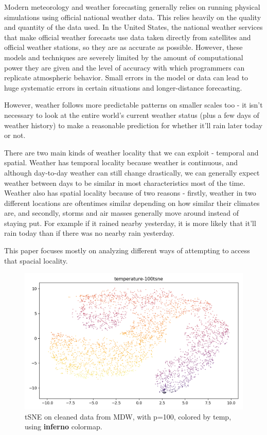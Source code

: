 \documentclass[a4paper]{article}
\begin{document}
Modern meteorology and weather forecasting generally relies on running physical simulations using official national weather data. This relies heavily on the quality and quantity of the data used. In the United States, the national weather services that make official weather forecasts use data taken directly from satellites and official weather stations, so they are as accurate as possible. However, these models and techniques are severely limited by the amount of computational power they are given and the level of accuracy with which programmers can replicate atmospheric behavior. Small errors in the model or data can lead to huge systematic errors in certain situations and longer-distance forecasting.

However, weather follows more predictable patterns on smaller scales too - it isn't necessary to look at the entire world's current weather status (plus a few days of weather history) to make a reasonable prediction for whether it'll rain later today or not. 

There are two main kinds of weather locality that we can exploit - temporal and spatial. Weather has temporal locality because weather is continuous, and although day-to-day weather can still change drastically, we can generally expect weather between days to be similar in most characteristics most of the time. Weather also has spatial locality because of two reasons - firstly, weather in two different locations are oftentimes similar depending on how similar their climates are, and secondly, storms and air masses generally move around instead of staying put. For example if it rained nearby yesterday, it is more likely that it'll rain today than if there was no nearby rain yesterday. 

This paper focuses mostly on analyzing different ways of attempting to access that spacial locality.

\begin{figure}[t]
  \centering
  \includegraphics[width=\linewidth]{../png/vis/temperature-100tsne.png}
  \caption{tSNE on cleaned data from MDW, with p=100, colored by temp, using \textbf{inferno} colormap.}
  \label{fig:15tsne_temp}
\end{figure}
\end{document}
